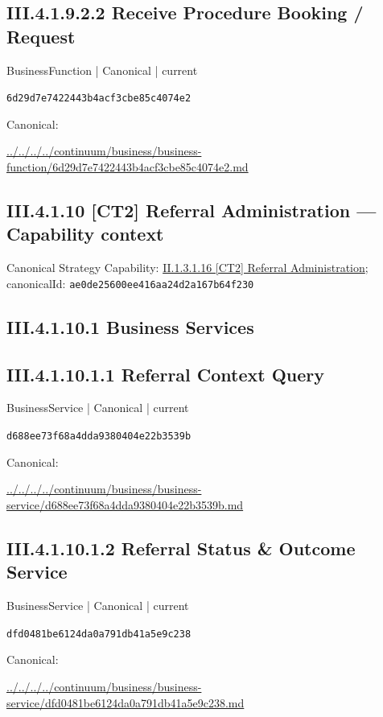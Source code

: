 \documentclass[10pt,a4paper]{article}
\begin{document}
\subsection*{III.4.1.9.2.2 Receive Procedure Booking / Request}
\label{element-6d29d7e7422443b4acf3cbe85c4074e2}
{\small BusinessFunction | Canonical | current}\par
\texttt{6d29d7e7422443b4acf3cbe85c4074e2}\par
Canonical: \par
{\footnotesize\url{../../../../continuum/business/business-function/6d29d7e7422443b4acf3cbe85c4074e2.md}}\par
\subsection*{III.4.1.10 [CT2] Referral Administration — Capability context}
Canonical Strategy Capability: \hyperref[element-ae0de25600ee416aa24d2a167b64f230]{II.1.3.1.16 [CT2] Referral Administration}; canonicalId: \texttt{ae0de25600ee416aa24d2a167b64f230}\par
\subsection*{III.4.1.10.1 Business Services}
\subsection*{III.4.1.10.1.1 Referral Context Query}
\label{element-d688ee73f68a4dda9380404e22b3539b}
{\small BusinessService | Canonical | current}\par
\texttt{d688ee73f68a4dda9380404e22b3539b}\par
Canonical: \par
{\footnotesize\url{../../../../continuum/business/business-service/d688ee73f68a4dda9380404e22b3539b.md}}\par
\subsection*{III.4.1.10.1.2 Referral Status \& Outcome Service}
\label{element-dfd0481be6124da0a791db41a5e9c238}
{\small BusinessService | Canonical | current}\par
\texttt{dfd0481be6124da0a791db41a5e9c238}\par
Canonical: \par
{\footnotesize\url{../../../../continuum/business/business-service/dfd0481be6124da0a791db41a5e9c238.md}}\par
\end{document}
